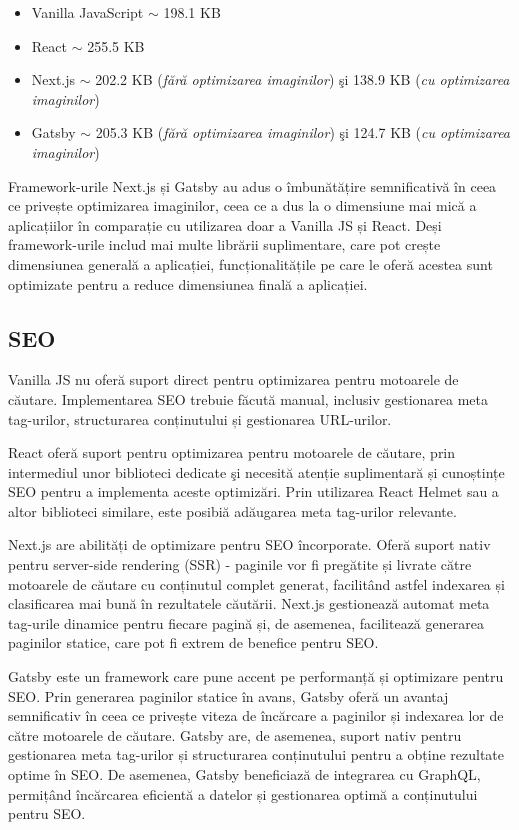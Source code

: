 \documentclass[12pt, a4paper]{report}
\begin{document}
\begin{itemize}
	\item Vanilla JavaScript \(\sim \) 198.1 KB
	\item React \(\sim \) 255.5 KB
	\item Next.js \(\sim \) 202.2 KB (\textit{f\u ar\u a optimizarea imaginilor}) \c si 138.9 KB (\textit{cu optimizarea imaginilor})
	\item Gatsby \(\sim \) 205.3 KB (\textit{f\u ar\u a optimizarea imaginilor}) \c si 124.7 KB (\textit{cu optimizarea imaginilor}) 
\end{itemize}

Framework-urile Next.js și Gatsby au adus o îmbunătățire semnificativă în ceea ce privește optimizarea imaginilor, ceea ce a dus la o dimensiune mai mică a aplicațiilor în comparație cu utilizarea doar a Vanilla JS și React. Deși framework-urile includ mai multe librării suplimentare, care pot crește dimensiunea generală a aplicației, funcționalitățile pe care le oferă acestea sunt optimizate pentru a reduce dimensiunea finală a aplicației.

\subsection{SEO}

Vanilla JS nu oferă suport direct pentru optimizarea pentru motoarele de căutare. Implementarea SEO trebuie făcută manual, inclusiv gestionarea meta tag-urilor, structurarea conținutului și gestionarea URL-urilor.

React oferă suport pentru optimizarea pentru motoarele de căutare, prin intermediul unor biblioteci dedicate \c si necesită atenție suplimentară și cunoștințe SEO pentru a implementa aceste optimizări. Prin utilizarea React Helmet sau a altor biblioteci similare, este posibi\u a adăugarea meta tag-urilor relevante.

Next.js are abilități de optimizare pentru SEO încorporate. Oferă suport nativ pentru server-side rendering (SSR) - paginile vor fi pregătite și livrate către motoarele de căutare cu conținutul complet generat, facilitând astfel indexarea și clasificarea mai bună în rezultatele căutării. Next.js gestionează automat meta tag-urile dinamice pentru fiecare pagină și, de asemenea, facilitează generarea paginilor statice, care pot fi extrem de benefice pentru SEO.

Gatsby este un framework care pune accent pe performanță și optimizare pentru SEO. Prin generarea paginilor statice în avans, Gatsby oferă un avantaj semnificativ în ceea ce privește viteza de încărcare a paginilor și indexarea lor de către motoarele de căutare. Gatsby are, de asemenea, suport nativ pentru gestionarea meta tag-urilor și structurarea conținutului pentru a obține rezultate optime în SEO. De asemenea, Gatsby beneficiază de integrarea cu GraphQL, permițând încărcarea eficientă a datelor și gestionarea optimă a conținutului pentru SEO.
\end{document}
